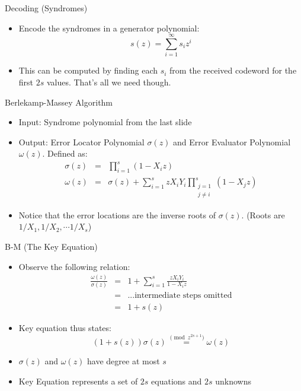 \documentclass[]{prosper}
\begin{document}
\begin{slide}{Decoding (Syndromes)}
\begin{itemize}
    \item Encode the syndromes in a generator polynomial:
    \[ s(z) = \sum_{i=1}^\infty s_i z^i \]
    \item This can be computed by finding each $s_i$ from the received codeword for the first $2s$ values. That's all we need though.
\end{itemize}
\end{slide}

\begin{slide}{Berlekamp-Massey Algorithm}
\begin{itemize}
    \item Input: Syndrome polynomial from the last slide
    \item Output: Error Locator Polynomial $\sigma(z)$ and Error Evaluator Polynomial $\omega(z)$. Defined as:
    \begin{eqnarray*}
    \sigma(z) &=& \prod_{i=1}^s (1 - X_i z) \\
    \omega(z) &=& \sigma(z) + \sum_{i=1}^s z X_i Y_i \prod_{\substack{j=1\\j \ne i}}^s (1 - X_j z)
    \end{eqnarray*}
    \item Notice that the error locations are the inverse roots of $\sigma(z)$. (Roots are $1/X_1, 1/X_2, \cdots 1/X_s$)
\end{itemize}
\end{slide}

\begin{slide}{B-M (The Key Equation)}
\begin{itemize}
    \item Observe the following relation:
    \begin{eqnarray*}
    \frac{\omega(z)}{\sigma(z)} &=& 1 + \sum_{i=1}^s \frac{z X_i Y_i}{1 - X_i z} \\
    &=& ... \text{intermediate steps omitted} \\
    &=& 1 + s(z)
    \end{eqnarray*}
    
    \item Key equation thus states:
    \[ (1 + s(z)) \sigma(z) \stackrel{\pmod{z^{2s+1}}}{=} \omega(z)  \]
    \item $\sigma(z)$ and $\omega(z)$ have degree at most $s$
    \item Key Equation represents a set of $2s$ equations and $2s$ unknowns
\end{itemize}
\end{slide}
\end{document}
